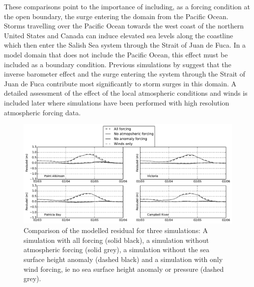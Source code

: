 \documentclass[pdftex,10pt]{article}
\begin{document}
These comparisons point to the importance of including, as a forcing condition at the open boundary, the surge entering the domain from the Pacific Ocean. Storms travelling over the Pacific Ocean towards the west coast of the northern United States and Canada can induce elevated sea levels along the coastline which then enter the Salish Sea system through the Strait of Juan de Fuca. In a model domain that does not include the Pacific Ocean, this effect must be included as a boundary condition. Previous simulations by \citet{murty1995storm} suggest that the inverse barometer effect and the surge entering the system through the Strait of Juan de Fuca contribute most significantly to storm surges in this domain.  A detailed assessment of the effect of the local atmospheric conditions and winds is included later where simulations have been performed with high resolution atmospheric forcing data.  

\begin{figure}
\centering
\includegraphics[scale=0.6]{Figures/feb2006_factors.pdf}
\caption{Comparison of the modelled residual for three simulations: A simulation with all forcing (solid black), a simulation without atmospheric forcing (solid grey), a simulation without the sea surface height anomaly (dashed black) and a simulation with only wind forcing, ie no sea surface height anomaly or pressure (dashed grey). }
\label{fig:factors}
\end{figure}
\end{document}
